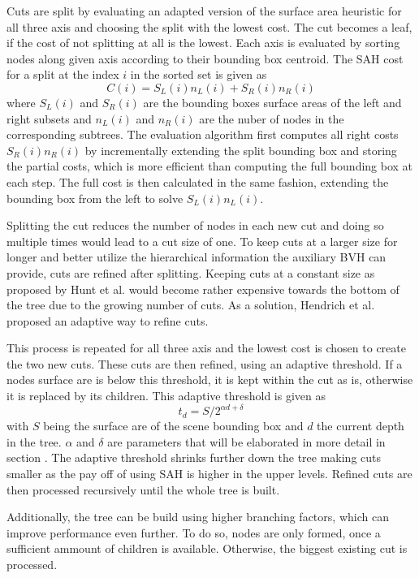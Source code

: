 Cuts are split by evaluating an adapted version of the surface area heuristic for all three axis and choosing the split with the lowest cost. The cut becomes a leaf, if the cost of not splitting at all is the lowest. Each axis is evaluated by sorting nodes along given axis according to their bounding box centroid. The SAH cost for a split at the index $i$ in the sorted set is given as 
\[C(i)=S_L(i)n_L(i)+S_R(i)n_R(i)\]
where $S_L(i)$ and $S_R(i)$ are the bounding boxes surface areas of the left and right subsets and $n_L(i)$ and $n_R(i)$ are the nuber of nodes in the corresponding subtrees. The evaluation algorithm first computes all right costs $S_R(i)n_R(i)$ by incrementally extending the split bounding box and storing the partial costs, which is more efficient than computing the full bounding box at each step. The full cost is then calculated in the same fashion, extending the bounding box from the left to solve $S_L(i)n_L(i)$. 

Splitting the cut reduces the number of nodes in each new cut and doing so multiple times would lead to a cut size of one. To keep cuts at a larger size for longer and better utilize the hierarchical information the auxiliary BVH can provide, cuts are refined after splitting. Keeping cuts at a constant size as proposed by Hunt et al.\cite{hunt07lazybuild} would become rather expensive towards the bottom of the tree due to the growing number of cuts. As a solution, Hendrich et al.\cite{hendrich_parallel_2017} proposed an adaptive way to refine cuts.  




This process is repeated for all three axis and the lowest cost is chosen to create the two new cuts. These cuts are then refined, using an adaptive threshold. If a nodes surface are is below this threshold, it is kept within the cut as is, otherwise it is replaced by its children. 
This adaptive threshold is given as 
\[t_d = S /{2^{\alpha d + \delta}}\]
with $S$ being the surface are of the scene bounding box and $d$ the current depth in the tree. $\alpha$ and $\delta$ are parameters that will be elaborated in more detail in section .
The adaptive threshold shrinks further down the tree making cuts smaller as the pay off of using SAH is higher in the upper levels. Refined cuts are then processed recursively until the whole tree is built. 

Additionally, the tree can be build using higher branching factors, which can improve performance even further. To do so, nodes are only formed, once a sufficient ammount of children is available. Otherwise, the biggest existing cut is processed. 

